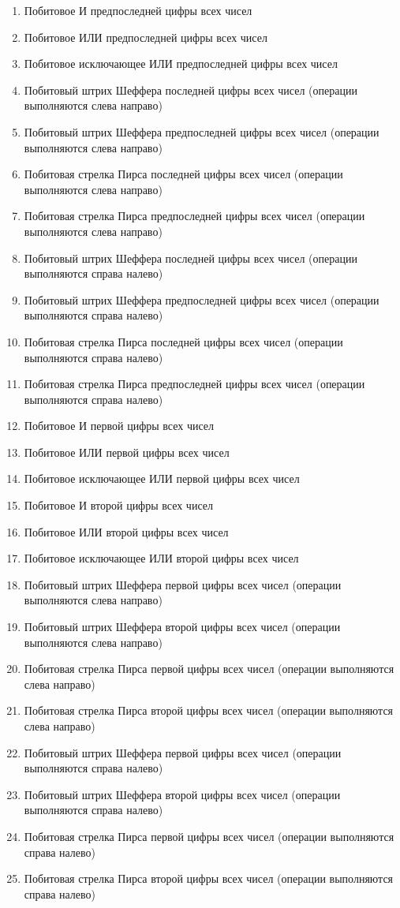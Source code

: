 \begin{enumerate}
	\item Побитовое И предпоследней цифры всех чисел
	\item Побитовое ИЛИ предпоследней цифры всех чисел
	\item Побитовое исключающее ИЛИ предпоследней цифры всех чисел
	\item Побитовый штрих Шеффера последней цифры всех чисел (операции выполняются слева направо)
	\item Побитовый штрих Шеффера предпоследней цифры всех чисел (операции выполняются слева направо)
	\item Побитовая стрелка Пирса последней цифры всех чисел (операции выполняются слева направо)
	\item Побитовая стрелка Пирса предпоследней цифры всех чисел (операции выполняются слева направо)
	\item Побитовый штрих Шеффера последней цифры всех чисел (операции выполняются справа налево)
	\item Побитовый штрих Шеффера предпоследней цифры всех чисел (операции выполняются справа налево)
	\item Побитовая стрелка Пирса последней цифры всех чисел (операции выполняются справа налево)
	\item Побитовая стрелка Пирса предпоследней цифры всех чисел (операции выполняются справа налево)
	\item Побитовое И первой цифры всех чисел
	\item Побитовое ИЛИ первой цифры всех чисел
	\item Побитовое исключающее ИЛИ первой цифры всех чисел
	\item Побитовое И второй цифры всех чисел
	\item Побитовое ИЛИ второй цифры всех чисел
	\item Побитовое исключающее ИЛИ второй цифры всех чисел
	\item Побитовый штрих Шеффера первой цифры всех чисел (операции выполняются слева направо)
	\item Побитовый штрих Шеффера второй цифры всех чисел (операции выполняются слева направо)
	\item Побитовая стрелка Пирса первой цифры всех чисел (операции выполняются слева направо)
	\item Побитовая стрелка Пирса второй цифры всех чисел (операции выполняются слева направо)
	\item Побитовый штрих Шеффера первой цифры всех чисел (операции выполняются справа налево)
	\item Побитовый штрих Шеффера второй цифры всех чисел (операции выполняются справа налево)
	\item Побитовая стрелка Пирса первой цифры всех чисел (операции выполняются справа налево)
	\item Побитовая стрелка Пирса второй цифры всех чисел (операции выполняются справа налево)
\end{enumerate}


